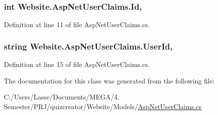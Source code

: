 \subsubsection[{Id}]{\setlength{\rightskip}{0pt plus 5cm}int Website.\+Asp\+Net\+User\+Claims.\+Id\hspace{0.3cm}{\ttfamily [get]}, {\ttfamily [set]}}\label{class_website_1_1_asp_net_user_claims_a987bf13aa51a358fa466df3a75b25201}


Definition at line 11 of file Asp\+Net\+User\+Claims.\+cs.

\hypertarget{class_website_1_1_asp_net_user_claims_a5c2c964aaa213a8bd3ebda162eb021cb}{}
\subsubsection[{User\+Id}]{\setlength{\rightskip}{0pt plus 5cm}string Website.\+Asp\+Net\+User\+Claims.\+User\+Id\hspace{0.3cm}{\ttfamily [get]}, {\ttfamily [set]}}\label{class_website_1_1_asp_net_user_claims_a5c2c964aaa213a8bd3ebda162eb021cb}


Definition at line 15 of file Asp\+Net\+User\+Claims.\+cs.



The documentation for this class was generated from the following file\+:\begin{DoxyCompactItemize}
\item 
C\+:/\+Users/\+Lasse/\+Documents/\+M\+E\+G\+A/4. Semester/\+P\+R\+J/quizcreator/\+Website/\+Models/\hyperlink{_asp_net_user_claims_8cs}{Asp\+Net\+User\+Claims.\+cs}\end{DoxyCompactItemize}
